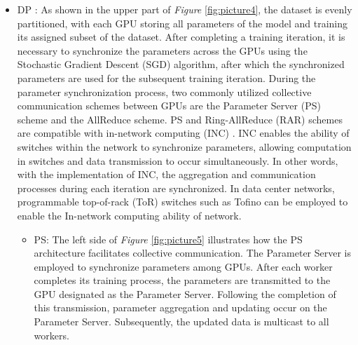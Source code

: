 \documentclass[conference]{IEEEtran}
\begin{document}
\begin{itemize}
	
	\item DP \cite{Parallelism}: As shown in the upper part of \emph{Figure} \ref{fig:picture4}, the dataset is evenly partitioned, with each GPU storing all parameters of the model and training its assigned subset of the dataset. After completing a training iteration, it is necessary to synchronize the parameters across the GPUs using the Stochastic Gradient Descent (SGD)  \cite{SGD2010} algorithm, after which the synchronized parameters are used for the subsequent training iteration. During the parameter synchronization process, two commonly utilized collective communication schemes between GPUs are the Parameter Server (PS) \cite{PS} scheme and the AllReduce scheme. PS and Ring-AllReduce (RAR) schemes are compatible with in-network computing (INC) \cite{INC2019, Rina}. INC enables the ability of switches within the network to synchronize parameters, allowing computation in switches and data transmission to occur simultaneously. In other words, with the implementation of INC, the aggregation and communication processes during each iteration are synchronized.	In data center networks, programmable top-of-rack (ToR) switches such as Tofino can be employed to enable the In-network computing ability of network.
	
	\begin{itemize}
		\item PS: The left side of \emph{Figure} \ref{fig:picture5} illustrates how the PS architecture facilitates collective communication. The Parameter Server is employed to synchronize parameters among GPUs. After each worker completes its training process, the parameters are transmitted to the GPU designated as the Parameter Server. Following the completion of this transmission, parameter aggregation and updating occur on the Parameter Server. Subsequently, the updated data is multicast to all workers.
		

\end{itemize}
\end{itemize}
\end{document}
